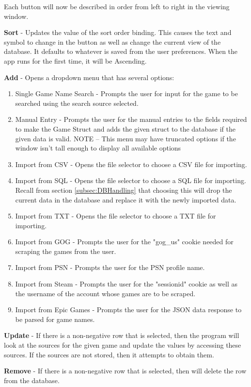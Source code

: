 Each button will now be described in order from left to right in the
viewing window.

\textbf{Sort} - Updates the value of the sort order binding. This
causes the text and symbol to change in the button as
well as change the current view of the database. It defaults to
whatever is saved from the user preferences. When the app runs for
the first time, it will be Ascending.

\textbf{Add} - Opens a dropdown menu that has several options:
\begin{enumerate}
	\item Single Game Name Search - Prompts the user for input for the
		game to be searched using the search source selected.
	\item Manual Entry - Prompts the user for
		the manual entries to the fields required to make the Game Struct
		and adds the given struct to the database if the given data is valid.
		NOTE -- This menu may have truncated options if the window isn't
		tall enough to display all available options
	\item Import from CSV - Opens the file selector to choose a CSV file
		for importing.
	\item Import from SQL - Opens the file selector to choose a SQL file
		for importing. Recall from section \ref{subsec:DBHandling} that choosing
		this will drop the current data in the database and replace it with
		the newly imported data.
	\item Import from TXT - Opens the file selector to choose a TXT file
		for importing.
	\item Import from GOG - Prompts the user for the
		"gog\_us" cookie needed for scraping the games from the user.
	\item Import from PSN - Prompts the user for the PSN profile name.
	\item Import from Steam - Prompts the user for the "sessionid"
		cookie as well as the username of the account whose games are to be scraped.
	\item Import from Epic Games - Prompts the user for the JSON data
		response to be parsed for game names.
\end{enumerate}

\textbf{Update} - If there is a non-negative row that is selected,
then the program will
look at the sources for the given game and update the values by
accessing these sources. If the sources are not stored, then it
attempts to obtain them.

\textbf{Remove} - If there is a non-negative row that is selected, then will
delete the row from the database.

